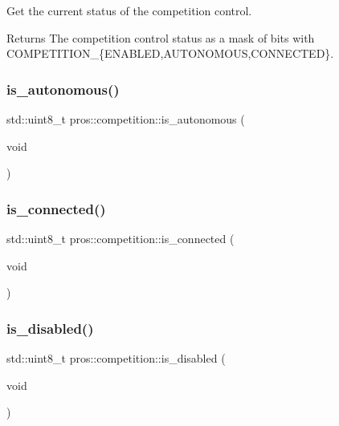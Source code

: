 Get the current status of the competition control. 

\begin{DoxyReturn}{Returns}
The competition control status as a mask of bits with C\+O\+M\+P\+E\+T\+I\+T\+I\+O\+N\+\_\+\{E\+N\+A\+B\+L\+ED,A\+U\+T\+O\+N\+O\+M\+O\+US,C\+O\+N\+N\+E\+C\+T\+ED\}. 
\end{DoxyReturn}
\mbox{\label{namespacepros_1_1competition_a88353a4f8e5e283558ee6504c54283af}} 
\subsubsection{\texorpdfstring{is\_autonomous()}{is\_autonomous()}}
{\footnotesize\ttfamily std\+::uint8\+\_\+t pros\+::competition\+::is\+\_\+autonomous (\begin{DoxyParamCaption}\item[{void}]{ }\end{DoxyParamCaption})}

\mbox{\label{namespacepros_1_1competition_aaf36367a2369390657f6bc4285f68c64}} 
\subsubsection{\texorpdfstring{is\_connected()}{is\_connected()}}
{\footnotesize\ttfamily std\+::uint8\+\_\+t pros\+::competition\+::is\+\_\+connected (\begin{DoxyParamCaption}\item[{void}]{ }\end{DoxyParamCaption})}

\mbox{\label{namespacepros_1_1competition_a2d4f4555af4c45f7f82ea75e1223899b}} 
\subsubsection{\texorpdfstring{is\_disabled()}{is\_disabled()}}
{\footnotesize\ttfamily std\+::uint8\+\_\+t pros\+::competition\+::is\+\_\+disabled (\begin{DoxyParamCaption}\item[{void}]{ }\end{DoxyParamCaption})}

